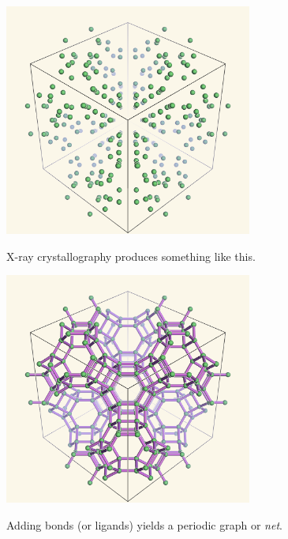 \documentclass{beamer}
\begin{document}
\begin{frame}
  \begin{center}
    \includegraphics[height=3in]{fau-atoms-new}

    X-ray crystallography produces something like this.
  \end{center}
\end{frame}

\begin{frame}
  \begin{center}
    \includegraphics[height=3in]{fau-net-new}

    Adding bonds (or ligands) yields a periodic graph or {\em net}.
  \end{center}
\end{frame}
\end{document}
